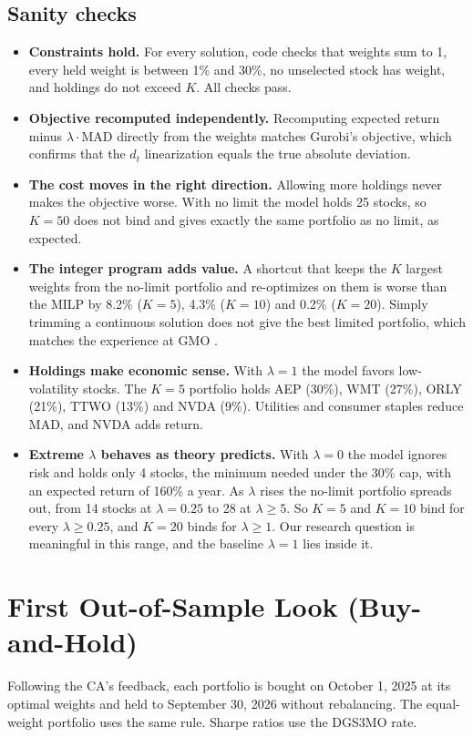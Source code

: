 \documentclass[11pt]{article}
\begin{document}
\subsection*{Sanity checks}
\begin{itemize}[leftmargin=*]
\item \textbf{Constraints hold.} For every solution, code checks that weights sum to 1, every held weight is between 1\% and 30\%, no unselected stock has weight, and holdings do not exceed $K$. All checks pass.
\item \textbf{Objective recomputed independently.} Recomputing expected return minus $\lambda\cdot$MAD directly from the weights matches Gurobi's objective, which confirms that the $d_t$ linearization equals the true absolute deviation.
\item \textbf{The cost moves in the right direction.} Allowing more holdings never makes the objective worse. With no limit the model holds 25 stocks, so $K=50$ does not bind and gives exactly the same portfolio as no limit, as expected.
\item \textbf{The integer program adds value.} A shortcut that keeps the $K$ largest weights from the no-limit portfolio and re-optimizes on them is worse than the MILP by 8.2\% ($K=5$), 4.3\% ($K=10$) and 0.2\% ($K=20$). Simply trimming a continuous solution does not give the best limited portfolio, which matches the experience at GMO \cite{bertsimas}.
\item \textbf{Holdings make economic sense.} With $\lambda=1$ the model favors low-volatility stocks. The $K=5$ portfolio holds AEP (30\%), WMT (27\%), ORLY (21\%), TTWO (13\%) and NVDA (9\%). Utilities and consumer staples reduce MAD, and NVDA adds return.
\item \textbf{Extreme $\lambda$ behaves as theory predicts.} With $\lambda=0$ the model ignores risk and holds only 4 stocks, the minimum needed under the 30\% cap, with an expected return of 160\% a year. As $\lambda$ rises the no-limit portfolio spreads out, from 14 stocks at $\lambda=0.25$ to 28 at $\lambda\ge 5$. So $K=5$ and $K=10$ bind for every $\lambda \ge 0.25$, and $K=20$ binds for $\lambda \ge 1$. Our research question is meaningful in this range, and the baseline $\lambda=1$ lies inside it.
\end{itemize}

\section{First Out-of-Sample Look (Buy-and-Hold)}
Following the CA's feedback, each portfolio is bought on October 1, 2025 at its optimal weights and held to September 30, 2026 without rebalancing. The equal-weight portfolio uses the same rule. Sharpe ratios use the DGS3MO rate.
\end{document}
